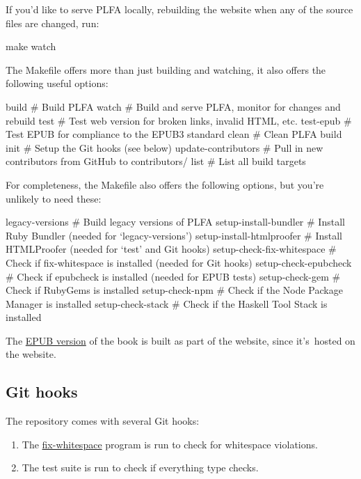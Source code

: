 If you'd like to serve PLFA locally, rebuilding the website when any of
the source files are changed, run:

\begin{myDisplay}
make watch
\end{myDisplay}

The Makefile offers more than just building and watching, it also offers
the following useful options:

\begin{myDisplay}
build                      # Build PLFA
watch                      # Build and serve PLFA, monitor for changes and rebuild
test                       # Test web version for broken links, invalid HTML, etc.
test-epub                  # Test EPUB for compliance to the EPUB3 standard
clean                      # Clean PLFA build
init                       # Setup the Git hooks (see below)
update-contributors        # Pull in new contributors from GitHub to contributors/
list                       # List all build targets
\end{myDisplay}

For completeness, the Makefile also offers the following options, but
you're unlikely to need these:

\begin{myDisplay}
legacy-versions            # Build legacy versions of PLFA
setup-install-bundler      # Install Ruby Bundler (needed for ‘legacy-versions’)
setup-install-htmlproofer  # Install HTMLProofer (needed for ‘test’ and Git hooks)
setup-check-fix-whitespace # Check if fix-whitespace is installed (needed for Git hooks)
setup-check-epubcheck      # Check if epubcheck is installed (needed for EPUB tests)
setup-check-gem            # Check if RubyGems is installed
setup-check-npm            # Check if the Node Package Manager is installed
setup-check-stack          # Check if the Haskell Tool Stack is installed
\end{myDisplay}

The \href{https://plfa.github.io/plfa.epub}{EPUB version} of the book is
built as part of the website, since it's~hosted on the website.

\hypertarget{git-hooks}{%
\subsection{Git hooks}\label{git-hooks}}

The repository comes with several Git hooks:

\begin{enumerate}
\def\labelenumi{\arabic{enumi}.}
\item
  The \href{https://github.com/agda/fix-whitespace}{fix-whitespace}
  program is run to check for whitespace violations.
\item
  The test suite is run to check if everything type checks.
\end{enumerate}

